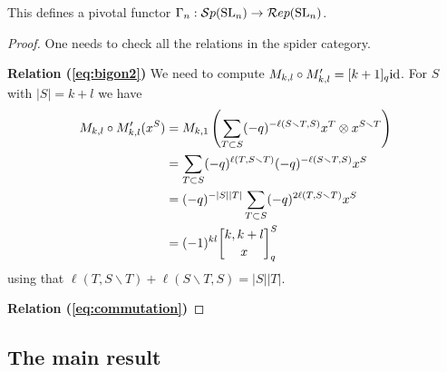 \documentclass[10pt,leqno]{article}
\begin{document}
\begin{thm}
This defines a pivotal functor $\Gamma_n: {\mathcal{S}p}({\rm{SL}}_n) \rightarrow \mathcal{R}ep({\rm{SL}}_n)$.
\end{thm}
\begin{proof}
One needs to check all the relations in the spider category. 

{\bf Relation (\ref{eq:bigon2})}  We need to compute $M_{k,l} \circ M'_{k,l} = [k+1]_q {\rm{id}}$. For $S $ with $|S|=k+l$ we have 
\begin{align*}
M_{k,l} \circ M'_{k,l}(x^S) 
&= M_{k,1} \left( \sum_{T \subset S} (-q)^{- \ell( S \smallsetminus T, S)} x^T \otimes x^{S \smallsetminus T} \right) \\
&= \sum_{T \subset S} (-q)^{\ell(T, S \smallsetminus T)} (-q)^{- \ell( S \smallsetminus T, S)} x^S \\
&= (-q)^{-|S||T|} \sum_{T \subset S} (-q)^{2\ell(T, S \smallsetminus T)} x^S \\
&= (-1)^{kl} \qBinomial{k, k+l} x^S
\end{align*}
using that $ \ell(T, S \smallsetminus T) + \ell( S \smallsetminus T, S) = |S||T| $.
 

{\bf Relation (\ref{eq:commutation})} 

\end{proof}


\subsection{The main result}\label{sec:main}
\end{document}
